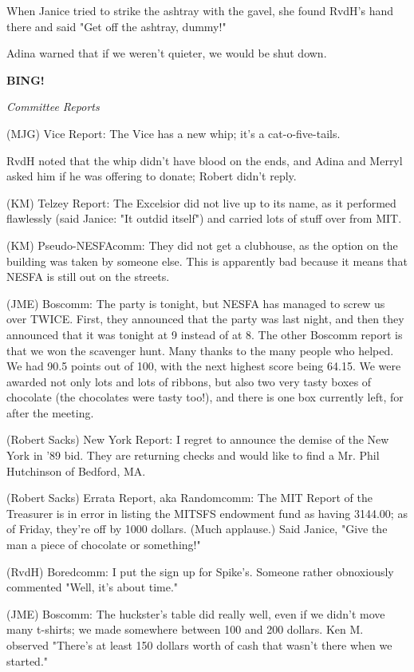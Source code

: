 \documentclass[12pt]{article}
\newcommand{\bing}{{\bf BING!} }
\newcommand{\goto}[1]{\bing \vskip 12pt \centerline{{\em{#1}}}}
\begin{document}
When Janice tried to strike the ashtray with the gavel, she found RvdH's hand there and said "Get off the ashtray, dummy!"

Adina warned that if we weren't quieter, we would be shut down.

\goto{Committee Reports}

(MJG) Vice Report: The Vice has a new whip; it's a cat-o-five-tails.

RvdH noted that the whip didn't have blood on the ends, and Adina and Merryl asked him if he was offering to donate; Robert didn't reply.

(KM) Telzey Report: The Excelsior did not live up to its name, as it performed flawlessly (said Janice: "It outdid itself") and carried lots of stuff over from MIT.

(KM) Pseudo-NESFAcomm: They did not get a clubhouse, as the option on the building was taken by someone else. This is apparently bad because it means that NESFA is still out on the streets.

(JME) Boscomm: The party is tonight, but NESFA has managed to screw us over TWICE. First, they announced that the party was last night, and then they announced that it was tonight at 9 instead of at 8. The other Boscomm report is that we won the scavenger hunt. Many thanks to the many people who helped. We had 90.5 points out of 100, with the next highest score being 64.15. We were awarded not only lots and lots of ribbons, but also two very tasty boxes of chocolate (the chocolates were tasty too!), and there is one box currently left, for after the meeting.

(Robert Sacks) New York Report: I regret to announce the demise of the New York in '89 bid. They are returning checks and would like to find a Mr. Phil Hutchinson of Bedford, MA.

(Robert Sacks) Errata Report, aka Randomcomm: The MIT Report of the Treasurer is in error in listing the MITSFS endowment fund as having 3144.00; as of Friday, they're off by 1000 dollars. (Much applause.) Said Janice, "Give the man a piece of chocolate or something!"

(RvdH) Boredcomm: I put the sign up for Spike's. Someone rather obnoxiously commented "Well, it's about time."

(JME) Boscomm: The huckster's table did really well, even if we didn't move many t-shirts; we made somewhere between 100 and 200 dollars. Ken M. observed "There's at least 150 dollars worth of cash that wasn't there when we started."
\end{document}
